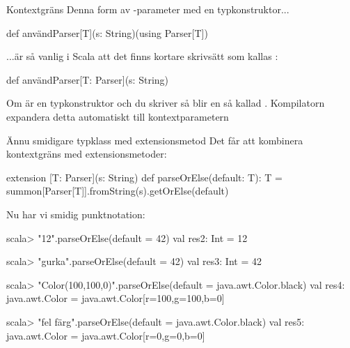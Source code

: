 \begin{Slide}{Kontextgräns}\SlideFontSmall
Denna form av -parameter med en typkonstruktor...
\begin{Code}
def användParser[T](s: String)(using Parser[T])
\end{Code}
...är så vanlig i Scala att det finns kortare skrivsätt som kallas :
\begin{Code}
def användParser[T: Parser](s: String)
\end{Code}
Om  är en typkonstruktor och du skriver \code{[T: F]} så blir  en så kallad  . 
Kompilatorn expandera detta automatiskt till kontextparametern 
\end{Slide}



\begin{Slide}{Ännu smidigare typklass med extensionsmetod}\SlideFontSmall
Det får att kombinera kontextgräns med extensionsmetoder:
\begin{Code}
extension [T: Parser](s: String) 
  def parseOrElse(default: T): T = 
    summon[Parser[T]].fromString(s).getOrElse(default)
\end{Code}
Nu har vi smidig punktnotation:
\begin{REPLsmall}
scala> "12".parseOrElse(default = 42)
val res2: Int = 12

scala> "gurka".parseOrElse(default = 42)
val res3: Int = 42

scala> "Color(100,100,0)".parseOrElse(default = java.awt.Color.black)
val res4: java.awt.Color = java.awt.Color[r=100,g=100,b=0]

scala> "fel färg".parseOrElse(default = java.awt.Color.black)
val res5: java.awt.Color = java.awt.Color[r=0,g=0,b=0]

\end{REPLsmall}
\end{Slide}



